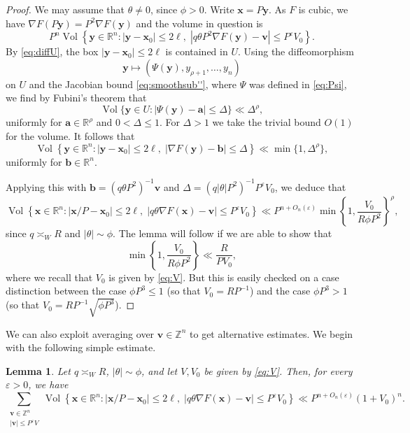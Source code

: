 \documentclass[a4paper,11pt, twoside,reqno]{amsart}
\theoremstyle{plain}
\newtheorem{lemma}[thm]{Lemma}
\theoremstyle{definition}
\theoremstyle{remark}
\newcommand{\bfv}{\bm{v}}
\newcommand{\bfx}{\bm{x}}
\newcommand{\bfy}{\bm{y}}
\newcommand{\ZZ}{\mathbb{Z}}
\newcommand{\RR}{\mathbb{R}}
\DeclareMathOperator{\meas}{Vol}
\newcommand{\x}{\bm{x}}
\newcommand{\y}{\bm{y}}
\newcommand{\ve}{\varepsilon}
\renewcommand{\le}{\leqslant}
\renewcommand{\leq}{\leqslant}
\numberwithin{equation}{section}
\begin{document}
\begin{proof}
We may assume that $\theta \neq 0$, since $\phi>0$.
Write $\x=P\y$.
As $F$ is cubic, we have
$\nabla F(P\y)=P^2\nabla F(\y)$ and the volume in question is
\[
P^n\meas\left\{
\bfy\in\RR^n:
|\bfy-\bm{x}_0|\le 2\ell,\;
|q\theta P^2\nabla F(\y)-\bm{v}|\leq P^\varepsilon V_0
\right\}.
\]
By \eqref{eq:diffU}, the box $|\bfy-\bm{x}_0|\le 2\ell$ is contained in $U$.
Using the diffeomorphism
$$\bfy\mapsto (\Psi(\bfy),y_{\rho+1},\dots,y_n)$$
on $U$ and the Jacobian bound \eqref{eq:smoothsub''},
where $\Psi$ was defined in \eqref{eq:Psi},
we find by Fubini's theorem that
\[
\meas\{\y\in U:|\Psi(\y)-\bm{a}|\leq \Delta\}
\ll \Delta^\rho ,
\]
uniformly for $\bm{a}\in\RR^\rho$ and $0<\Delta\leq 1$.
For $\Delta>1$ we take the trivial bound $O(1)$ for the volume. 
It follows that
\begin{equation}
\label{preslop}
\meas\left\{
\bfy\in\RR^n:
|\bfy-\bm{x}_0|\le 2\ell,\;
|\nabla F(\y)-\bm{b}|\leq \Delta
\right\}
\ll \min\{1,\Delta^\rho\},
\end{equation}
uniformly 
for $\bm{b}\in\RR^n$.


Applying this with $\bm{b}=(q\theta P^2)^{-1}\bm{v}$ and 
$\Delta= (q|\theta|P^2 )^{-1}P^\varepsilon V_0$, we deduce that 
\begin{equation*}
\meas\left\{
\bfx\in\RR^n:
|\bfx/P-\bm{x}_0|\le 2\ell,\;
|q\theta\nabla F(\bm{x})-\bm{v}|\leq P^\varepsilon V_0
\right\}
\ll 
P^{n+O_n(\ve)}
\min\left\{
1,
\frac{ V_0}{R\phi P^2}
\right\}^\rho,
\end{equation*}
since $q\asymp_W R$ and $|\theta|\sim\phi$. The lemma will follow if we are able to show that 
$$
\min\left\{
1,
\frac{ V_0}{R\phi P^2}\right\}
\ll \frac{R}{PV_0},
$$
where we recall that $V_0$ is given by \eqref{eq:V}. 
But this is easily checked on a case distinction between 
the case  $\phi P^3\leq 1$ (so that $V_0=RP^{-1}$) and the case
 $\phi P^3>1$ (so that $V_0=RP^{-1}\sqrt{\phi P^3}$).
\end{proof}


We  can also exploit averaging over $\bfv\in \ZZ^n$ to get alternative estimates. We begin with the following simple estimate.

\begin{lemma}\label{lem:gradient-volume2}
Let $q\asymp_W R$, $|\theta|\sim \phi$, and let $V, V_0$ be given by \eqref{eq:V}.
Then, for every $\varepsilon>0$,
we have
\[
\sum_{\substack{\bm{v}\in \ZZ^n\\ 
|\bm{v}|\leq P^\ve V}}
\meas\left\{
\bfx\in\RR^n:
|\bfx/P-\bm{x}_0|\le 2\ell,\;
|q\theta\nabla F(\bm{x})-\bm{v}|\leq P^\varepsilon V_0
\right\}
\ll
P^{n+O_n(\varepsilon)}(1+V_0)^n.
\]
\end{lemma}
\end{document}
